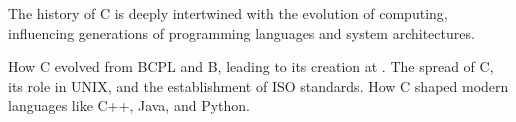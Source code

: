 \begin{NxSSBox}[][History of C]
	\begin{NxIDBox}
		The history of C is deeply intertwined with the evolution of computing, influencing generations of programming languages and system architectures.
	\end{NxIDBox}
	\begin{NxIDBoxL}
		 How C evolved from BCPL and B, leading to its creation at .
		 The spread of C, its role in UNIX, and the establishment of ISO standards.
		 How C shaped modern languages like C++, Java, and Python.
	\end{NxIDBoxL}
\end{NxSSBox}





